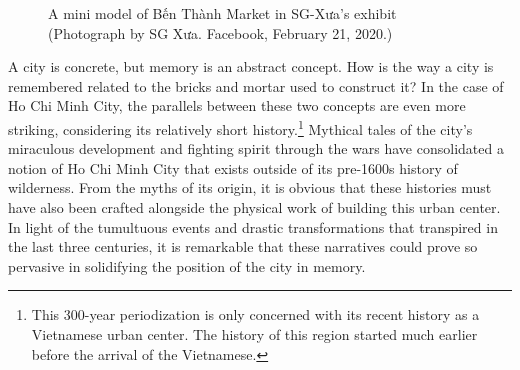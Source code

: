 \begin{figure}[!ht]
\begin{center}
\vspace{-.2 in}
\caption[\vi Sg-Xưa's Exhibit]{\vi A mini model of Bến Thành Market in SG-Xưa's exhibit (Photograph by SG Xưa. Facebook, February 21, 2020.\footnotemark)}\label{sgxua}
\end{center}
\vspace{-.4 in}
\end{figure}

\vi A city is concrete, but memory is an abstract concept. How is the way a city is remembered related to the bricks and mortar used to construct it? In the case of Ho Chi Minh City, the parallels between these two concepts are even more striking, considering its relatively short history.\footnote{This 300-year periodization is only concerned with its recent history as a Vietnamese urban center. The history of this region started much earlier before the arrival of the Vietnamese.} Mythical tales of the city's miraculous development and fighting spirit through the wars have consolidated a notion of Ho Chi Minh City that exists outside of its pre-1600s history of wilderness. From the myths of its origin, it is obvious that these histories must have also been crafted alongside the physical work of building this urban center. In light of the tumultuous events and drastic transformations that transpired in the last three centuries, it is remarkable that these narratives could prove so pervasive in solidifying the position of the city in memory.

